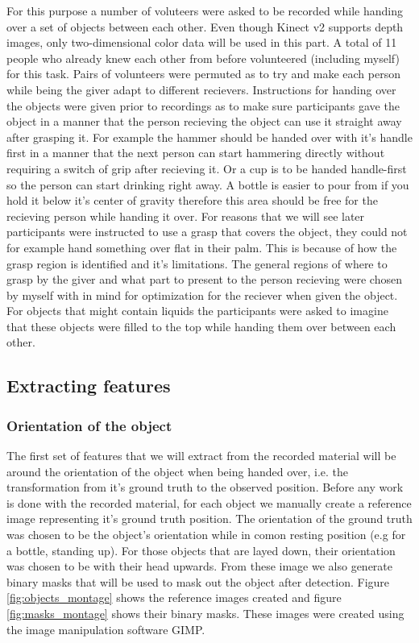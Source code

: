 For this purpose a number of voluteers were asked to be recorded while handing over a set of objects between each other. Even though Kinect v2 supports depth images, only two-dimensional color data will be used in this part. A total of 11 people who already knew each other from before volunteered (including myself) for this task. Pairs of volunteers were permuted as to try and make each person while being the giver adapt to different recievers. Instructions for handing over the objects were given prior to recordings as to make sure participants gave the object in a manner that the person recieving the object can use it straight away after grasping it. For example the hammer should be handed over with it's handle first in a manner that the next person can start hammering directly without requiring a switch of grip after recieving it. Or a cup is to be handed handle-first so the person can start drinking right away. A bottle is easier to pour from if you hold it below it's center of gravity therefore this area should be free for the recieving person while handing it over. For reasons that we will see later participants were instructed to use a grasp that covers the object, they could not for example hand something over flat in their palm. This is because of how the grasp region is identified and it's limitations. The general regions of where to grasp by the giver and what part to present to the person recieving were chosen by myself with in mind for optimization for the reciever when given the object. For objects that might contain liquids the participants were asked to imagine that these objects were filled to the top while handing them over between each other.

\subsection{Extracting features}

\subsubsection{Orientation of the object}

The first set of features that we will extract from the recorded material will be around the orientation of the object when being handed over, i.e. the transformation from it's ground truth to the observed position. Before any work is done with the recorded material, for each object we manually create a reference image representing it's ground truth position. The orientation of the ground truth was chosen to be the object's orientation while in comon resting position (e.g for a bottle, standing up). For those objects that are layed down, their orientation was chosen to be with their head upwards. From these image we also generate binary masks that will be used to mask out the object after detection. Figure \ref{fig:objects_montage} shows the reference images created and figure \ref{fig:masks_montage} shows their binary masks. These images were created using the image manipulation software GIMP.

